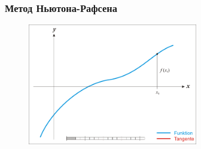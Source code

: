 \documentclass[12pt, aspectratio=169]{beamer}
\begin{document}
\begin{frame}\frametitle{Метод Ньютона-Рафсена}
\begin{figure}[htbp]
  \includegraphics[height=150pt, keepaspectratio = true]{images/newton-2}   
\end{figure}
\end{frame}
\end{document}
